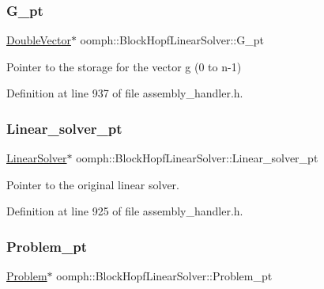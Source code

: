 \subsubsection{\texorpdfstring{G\+\_\+pt}{G\_pt}}
{\footnotesize\ttfamily \hyperlink{classoomph_1_1DoubleVector}{Double\+Vector}$\ast$ oomph\+::\+Block\+Hopf\+Linear\+Solver\+::\+G\+\_\+pt\hspace{0.3cm}{\ttfamily [private]}}



Pointer to the storage for the vector g (0 to n-\/1) 



Definition at line 937 of file assembly\+\_\+handler.\+h.

\mbox{\label{classoomph_1_1BlockHopfLinearSolver_a2526b2121ee73c372a4f3880e174f731}} 
\subsubsection{\texorpdfstring{Linear\+\_\+solver\+\_\+pt}{Linear\_solver\_pt}}
{\footnotesize\ttfamily \hyperlink{classoomph_1_1LinearSolver}{Linear\+Solver}$\ast$ oomph\+::\+Block\+Hopf\+Linear\+Solver\+::\+Linear\+\_\+solver\+\_\+pt\hspace{0.3cm}{\ttfamily [private]}}



Pointer to the original linear solver. 



Definition at line 925 of file assembly\+\_\+handler.\+h.

\mbox{\label{classoomph_1_1BlockHopfLinearSolver_a669990e3fce8c84545e112c4f5f3ffd0}} 
\subsubsection{\texorpdfstring{Problem\+\_\+pt}{Problem\_pt}}
{\footnotesize\ttfamily \hyperlink{classoomph_1_1Problem}{Problem}$\ast$ oomph\+::\+Block\+Hopf\+Linear\+Solver\+::\+Problem\+\_\+pt\hspace{0.3cm}{\ttfamily [private]}}



